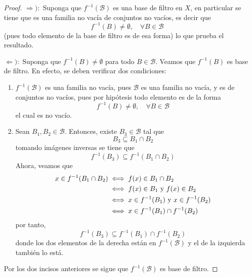 \documentclass[12pt]{report}
\theoremstyle{largebreak}
\begin{document}
    \begin{proof}
        $\Rightarrow):$ Suponga que $f^{-1}(\mathcal{B})$ es una base de filtro en $X$, en particular se tiene que es una familia no vacía de conjuntos no vacíos, es decir que
        \begin{equation*}
            f^{-1}(B)\neq\emptyset,\quad\forall B\in\mathcal{B}
        \end{equation*}
        (pues todo elemento de la base de filtro es de esa forma) lo que prueba el resultado.

        $\Leftarrow):$ Suponga que $f^{-1}(B)\neq\emptyset$ para todo $B\in\mathcal{B}$. Veamos que $f^{-1}(B)$ es base de filtro. En efecto, se deben verificar dos condiciones:
        \begin{enumerate}
            \item $f^{-1}(\mathcal{B})$ es una familia no vacía, pues $\mathcal{B}$ es una familia no vacía, y es de conjuntos no vacíos, pues por hipótesis todo elemento es de la forma
            \begin{equation*}
                f^{-1}(B)\neq\emptyset,\quad\forall B\in\mathcal{B}
            \end{equation*}
            el cual es no vacío.
            \item Sean $B_1,B_2\in\mathcal{B}$. Entonces, existe $B_3\in\mathcal{B}$ tal que
            \begin{equation*}
                B_3\subseteq B_1\cap B_2
            \end{equation*}
            tomando imágenes inversas se tiene que
            \begin{equation*}
                f^{-1}(B_3)\subseteq f^{-1}(B_1\cap B_2)
            \end{equation*}
            Ahora, veamos que
            \begin{equation*}
                \begin{split}
                    x\in f^{-1}(B_1\cap B_2)&\iff f(x)\in B_1\cap B_2\\
                    &\iff f(x)\in B_1\textup{ y }f(x)\in B_2\\
                    &\iff x\in f^{-1}(B_1)\textup{ y }x\in f^{-1}(B_2)\\
                    &\iff x\in f^{-1}(B_1)\cap f^{-1}(B_2)\\
                \end{split}
            \end{equation*}
            por tanto,
            \begin{equation*}
                f^{-1}(B_3)\subseteq f^{-1}(B_1)\cap f^{-1}(B_2)
            \end{equation*}
            donde los dos elementos de la derecha están en $f^{-1}(\mathcal{B})$ y el de la izquierda también lo está.
        \end{enumerate}
        Por los dos incisos anteriores se sigue que $f^{-1}(\mathcal{B})$ es base de filtro.
    \end{proof}
\end{document}
